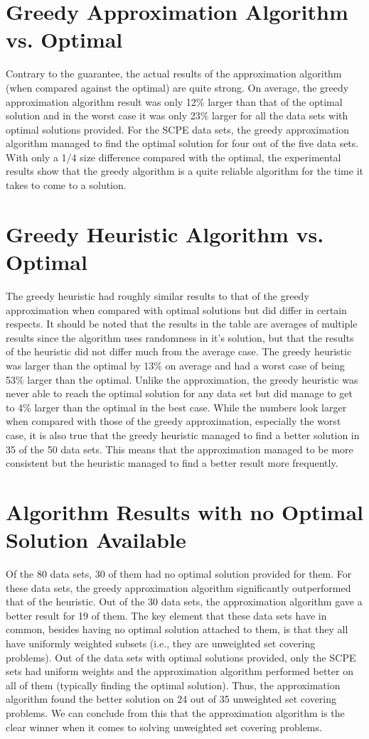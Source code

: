 \section{Greedy Approximation Algorithm vs. Optimal}
Contrary to the guarantee, the actual results of the approximation algorithm (when compared against the optimal) are quite strong. On average, the greedy approximation algorithm result was only 12\% larger than that of the optimal solution and in the worst case it was only 23\% larger for all the data sets with optimal solutions provided. For the SCPE data sets, the greedy approximation algorithm managed to find the optimal solution for four out of the five data sets. With only a 1/4 size difference compared with the optimal, the experimental results show that the greedy algorithm is a quite reliable algorithm for the time it takes to come to a solution.

\section{Greedy Heuristic Algorithm vs. Optimal}
The greedy heuristic had roughly similar results to that of the greedy approximation when compared with optimal solutions but did differ in certain respects. It should be noted that the results in the table are averages of multiple results since the algorithm uses randomness in it's solution, but that the results of the heuristic did not differ much from the average case. The greedy heuristic was larger than the optimal by 13\% on average and had a worst case of being 53\% larger than the optimal. Unlike the approximation, the greedy heuristic was never able to reach the optimal solution for any data set but did manage to get to 4\% larger than the optimal in the best case. While the numbers look larger when compared with those of the greedy approximation, especially the worst case, it is also true that the greedy heuristic managed to find a better solution in 35 of the 50 data sets. This means that the approximation managed to be more consistent but the heuristic managed to find a better result more frequently.

\section{Algorithm Results with no Optimal Solution Available}
Of the 80 data sets, 30 of them had no optimal solution provided for them. For these data sets, the greedy approximation algorithm significantly outperformed that of the heuristic. Out of the 30 data sets, the approximation algorithm gave a better result for 19 of them. The key element that these data sets have in common, besides having no optimal solution attached to them, is that they all have uniformly weighted subsets (i.e., they are unweighted set covering problems). Out of the data sets with optimal solutions provided, only the SCPE sets had uniform weights and the approximation algorithm performed better on all of them (typically finding the optimal solution). Thus, the approximation algorithm found the better solution on 24 out of 35 unweighted set covering problems. We can conclude from this that the approximation algorithm is the clear winner when it comes to solving unweighted set covering problems.

